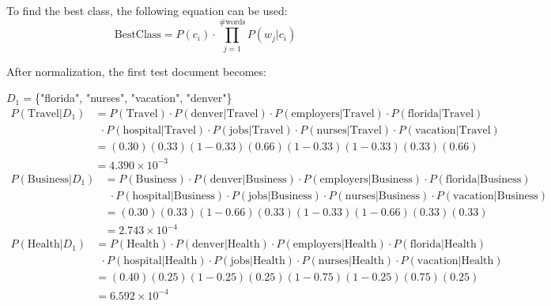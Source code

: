 \documentclass[11pt]{article}
\begin{document}
\begin{enumerate}
        To find the best class, the following equation can be used:
        \begin{equation*}
            \text{BestClass} = P(c_i) \cdot \prod_{j=1}^{\text{\# words}}P(w_j|c_i)
        \end{equation*}

        After normalization, the first test document becomes: 
        
        $D_1=$\{"florida", "nurses", "vacation", "denver"\}
        \begin{align*}
            P(\text{Travel}|D_1) &= P(\text{Travel}) \cdot P(\text{denver}|\text{Travel}) \cdot P(\text{employers}|\text{Travel}) \cdot P(\text{florida}|\text{Travel}) \\
            & \ \ \cdot P(\text{hospital}|\text{Travel}) \cdot P(\text{jobs}|\text{Travel}) \cdot P(\text{nurses}|\text{Travel}) \cdot P(\text{vacation}|\text{Travel}) \\
            &= (0.30)(0.33)(1 - 0.33)(0.66)(1 - 0.33)(1 - 0.33)(0.33)(0.66) \\
            &= 4.390\times10^{-3}
        \end{align*}
        \begin{align*}
            P(\text{Business}|D_1) &= P(\text{Business}) \cdot P(\text{denver}|\text{Business}) \cdot P(\text{employers}|\text{Business}) \cdot P(\text{florida}|\text{Business}) \\
            & \ \ \cdot P(\text{hospital}|\text{Business}) \cdot P(\text{jobs}|\text{Business}) \cdot P(\text{nurses}|\text{Business}) \cdot P(\text{vacation}|\text{Business}) \\
            &= (0.30)(0.33)(1 - 0.66)(0.33)(1 - 0.33)(1 - 0.66)(0.33)(0.33) \\
            &= 2.743\times10^{-4}
        \end{align*}
        \begin{align*}
            P(\text{Health}|D_1) &= P(\text{Health}) \cdot P(\text{denver}|\text{Health}) \cdot P(\text{employers}|\text{Health}) \cdot P(\text{florida}|\text{Health}) \\
            & \ \ \cdot P(\text{hospital}|\text{Health}) \cdot P(\text{jobs}|\text{Health}) \cdot P(\text{nurses}|\text{Health}) \cdot P(\text{vacation}|\text{Health}) \\
            &= (0.40)(0.25)(1 - 0.25)(0.25)(1 - 0.75)(1 - 0.25)(0.75)(0.25)            \\
            &= 6.592\times10^{-4}
        \end{align*}


\end{enumerate}
\end{document}
